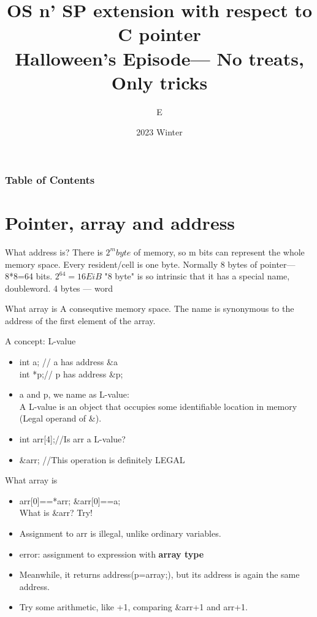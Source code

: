 \documentclass{beamer}
\title{OS n' SP extension with respect to C pointer \\{\small Halloween's Episode--- No treats, Only tricks}}
\author{E}
\institute{University of Birmingham}
\date{2023 Winter}
\begin{document}
\frame{\titlepage}

\begin{frame}
    \frametitle{Table of Contents}
    \tableofcontents
\end{frame}


\section{Pointer, array and address}
\begin{frame}{What address is?}
  There is $2^m byte$ of memory, so m bits can represent the whole memory space. 
  Every resident/cell is one byte. 
  Normally 8 bytes of pointer---8*8=64 bits. $2^64=16 EiB$
  "8 byte" is so intrinsic that it has a special name, doubleword. 4 bytes --- word
\end{frame}

\begin{frame}{What array is}
  A consequtive memory space.
  The name is synonymous to the address of the first element of the array.
\end{frame}

\begin{frame}{A concept: L-value}
  \begin{itemize}
    \item <1->   
    int a; // a has address \&a  \\
    int *p;// p has address \&p;
    \item <2->
    a and p, we name as L-value:\\
    A L-value is an object that occupies some identifiable location in memory (Legal operand of \&).
    \item<3-> int arr[4];//Is arr a  L-value?
    \item <4-> \&arr; //This operation is definitely LEGAL
  \end{itemize}
  
\end{frame}

\begin{frame}{What array is}
  \begin{itemize}
    \item <1->   
    arr[0]==*arr; \&arr[0]==a;\\
    What is \&arr? Try!
    \item <2->
    Assignment to arr is illegal, unlike ordinary variables. 
    \item<3-> error: assignment to expression with \textbf{array type}
    \item <4-> Meanwhile, it returns address(p=array;), but its address is again the same address.
    \item <5-> Try some arithmetic, like +1, comparing \&arr+1 and arr+1.
  \end{itemize}
 
\end{frame}
\end{document}
